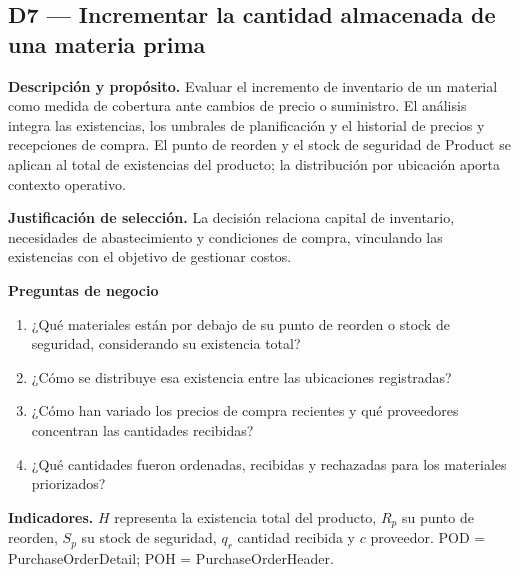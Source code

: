 \documentclass[10pt,a4paper]{article}
\begin{document}
\subsection*{D7 — Incrementar la cantidad almacenada de una materia prima}

\textbf{Descripción y propósito.} Evaluar el incremento de inventario de un
material como medida de cobertura ante cambios de precio o suministro. El
análisis integra las existencias, los umbrales de planificación y el historial
de precios y recepciones de compra. El punto de reorden y el stock de seguridad
de Product se aplican al total de existencias del producto; la distribución
por ubicación aporta contexto operativo.

\textbf{Justificación de selección.} La decisión relaciona capital de
inventario, necesidades de abastecimiento y condiciones de compra, vinculando
las existencias con el objetivo de gestionar costos.

\textbf{Preguntas de negocio}
\begin{enumerate}
  \item ¿Qué materiales están por debajo de su punto de reorden o stock de
  seguridad, considerando su existencia total?
  \item ¿Cómo se distribuye esa existencia entre las ubicaciones registradas?
  \item ¿Cómo han variado los precios de compra recientes y qué proveedores
  concentran las cantidades recibidas?
  \item ¿Qué cantidades fueron ordenadas, recibidas y rechazadas para los
  materiales priorizados?
\end{enumerate}

\textbf{Indicadores.} \(H\) representa la existencia total del producto,
\(R_p\) su punto de reorden, \(S_p\) su stock de seguridad, \(q_r\) cantidad
recibida y \(c\) proveedor.
POD = PurchaseOrderDetail; POH = PurchaseOrderHeader.
\end{document}
